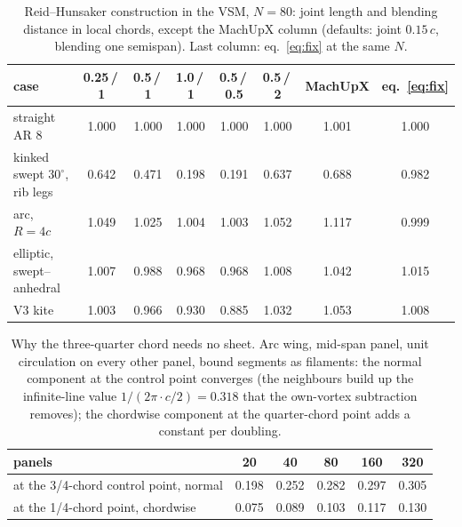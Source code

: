 \documentclass[11pt,a4paper]{article}
\begin{document}
\begin{table}[h]\centering\small
\caption{Reid--Hunsaker construction in the VSM, $N=80$: joint length and blending distance in local chords, except the MachUpX column (defaults: joint $0.15\,c$, blending one semispan). Last column: eq.~\eqref{eq:fix} at the same $N$.}
\label{tab:rh}
\begin{tabular}{lccccccc}
\toprule
case & 0.25\,/\,1 & 0.5\,/\,1 & 1.0\,/\,1 & 0.5\,/\,0.5 & 0.5\,/\,2 & MachUpX & eq.~\eqref{eq:fix}\\
\midrule
straight AR 8 & 1.000 & 1.000 & 1.000 & 1.000 & 1.000 & 1.001 & 1.000\\
kinked swept $30^\circ$, rib legs & 0.642 & 0.471 & 0.198 & 0.191 & 0.637 & 0.688 & 0.982\\
arc, $R=4c$ & 1.049 & 1.025 & 1.004 & 1.003 & 1.052 & 1.117 & 0.999\\
elliptic, swept--anhedral & 1.007 & 0.988 & 0.968 & 0.968 & 1.008 & 1.042 & 1.015\\
V3 kite & 1.003 & 0.966 & 0.930 & 0.885 & 1.032 & 1.053 & 1.008\\
\bottomrule
\end{tabular}
\end{table}

\begin{table}[h]\centering\small
\caption{Why the three-quarter chord needs no sheet. Arc wing, mid-span panel, unit circulation on every other panel, bound segments as filaments: the normal component at the control point converges (the neighbours build up the infinite-line value $1/(2\pi\cdot c/2)=0.318$ that the own-vortex subtraction removes); the chordwise component at the quarter-chord point adds a constant per doubling.}
\label{tab:cpconv}
\begin{tabular}{lccccc}
\toprule
panels & 20 & 40 & 80 & 160 & 320\\
\midrule
at the 3/4-chord control point, normal & 0.198 & 0.252 & 0.282 & 0.297 & 0.305\\
at the 1/4-chord point, chordwise & 0.075 & 0.089 & 0.103 & 0.117 & 0.130\\
\bottomrule
\end{tabular}
\end{table}
\end{document}
